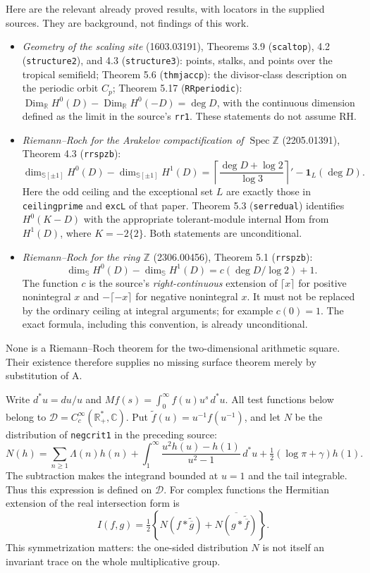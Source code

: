 Here are the relevant already proved results, with locators in the supplied
sources.  They are background, not findings of this work.
\begin{itemize}
\item \emph{Geometry of the scaling site} (1603.03191), Theorems 3.9
(\texttt{scaltop}), 4.2 (\texttt{structure2}), and 4.3
(\texttt{structure3}): points, stalks, and points over the tropical
semifield; Theorem 5.6 (\texttt{thmjaccp}): the divisor-class description
on the periodic orbit $C_p$; Theorem 5.17 (\texttt{RRperiodic}):
$\operatorname{Dim}_{\mathbb R}H^0(D)-\operatorname{Dim}_{\mathbb R}H^0(-D)
=\deg D$, with the continuous dimension defined as the limit in the
source's \texttt{rr1}.  These statements do not assume RH.
\item \emph{Riemann--Roch for the Arakelov compactification of
$\operatorname{Spec}\mathbb Z$} (2205.01391), Theorem 4.3
(\texttt{rrspzb}):
\[
 \dim_{\mathbb S[\pm1]}H^0(D)-\dim_{\mathbb S[\pm1]}H^1(D)
 =\left\lceil\frac{\deg D+\log2}{\log3}\right\rceil'
 -\mathbf1_L(\deg D).
\]
Here the odd ceiling and the exceptional set $L$ are exactly those in
\texttt{ceilingprime} and \texttt{excL} of that paper.  Theorem 5.3
(\texttt{serredual}) identifies
$H^0(K-D)$ with the appropriate tolerant-module internal Hom from
$H^1(D)$, where $K=-2\{2\}$.  Both statements are unconditional.
\item \emph{Riemann--Roch for the ring $\mathbb Z$} (2306.00456),
Theorem 5.1 (\texttt{rrspzb}):
\[
 \dim_{\mathbb S}H^0(D)-\dim_{\mathbb S}H^1(D)
 =c(\deg D/\log2)+1.
\]
The function $c$ is the source's \emph{right-continuous} extension of
$\lceil x\rceil$ for positive nonintegral $x$ and
$-\lceil-x\rceil$ for negative nonintegral $x$.  It must not be replaced
by the ordinary ceiling at integral arguments; for example $c(0)=1$.
The exact formula, including this convention, is already unconditional.
\end{itemize}
None is a Riemann--Roch theorem for the two-dimensional arithmetic square.
Their existence therefore supplies no missing surface theorem merely by
substitution of A.

Write $d^*u=du/u$ and
$Mf(s)=\int_0^\infty f(u)u^s\,d^*u$.  All test functions below belong to
$\mathcal D=C_c^\infty(\mathbb R_+^*,\mathbb C)$.
Put $\widetilde f(u)=u^{-1}f(u^{-1})$, and let $N$ be the distribution
of \texttt{negcrit1} in the preceding source:
\[
 N(h)=\sum_{n\geq1}\Lambda(n)h(n)
 +\int_1^\infty\frac{u^2h(u)-h(1)}{u^2-1}\,d^*u
 +\tfrac12(\log\pi+\gamma)h(1).
\]
The subtraction makes the integrand bounded at $u=1$ and the tail
integrable.  Thus this expression is defined on $\mathcal D$.
For complex functions the Hermitian extension of the real intersection
form is
\[
 I(f,g)=\tfrac12\left\{N(f*\widetilde{\overline g})+
             \overline{N(g*\widetilde{\overline f})}\right\}.
\]
This symmetrization matters: the one-sided distribution $N$ is not itself
an invariant trace on the whole multiplicative group.


